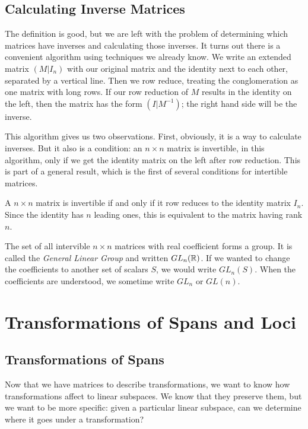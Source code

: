 \documentclass[fleqn]{report}
\begin{document}
\section{Calculating Inverse Matrices}

The definition is good, but we are left with the problem of
determining which matrices have inverses and calculating those
inverses. It turns out there is a convenient algorithm using
techniques we already know. We write an extended matrix
$(M|I_n)$ with our original matrix and the identity next to
each other, separated by a vertical line. Then we row reduce,
treating the conglomeration as one matrix with long rows.
If our row reduction of $M$ results in the identity on the
left, then the matrix has the form $(I|M^{-1})$; the right
hand side will be the inverse.

This algorithm gives us two observations. First, obviously,
it is a way to calculate inverses. But it also is a
condition: an $n \times n$ matrix is invertible, in this
algorithm, only if we get the identity matrix on the left after
row reduction. This is part of a general result, which is the
first of several conditions for intertible matrices.

\begin{prop}
A $n \times n$ matrix is invertible if and only if it row
reduces to the identity matrix $I_n$. Since the identity has
$n$ leading ones, this is equivalent to the matrix having rank
$n$.
\end{prop}

\begin{defn}
The set of all intervible $n \times n$ matrices with real
coefficient forms a group. It is called the \emph{General
Linear Group} and written $GL_n(\mathbb{R})$. If we wanted to change
the coefficients to another set of scalars $S$, we would write
$GL_n(S)$. When the coefficients are understood, we sometime
write $GL_n$ or $GL(n)$.
\end{defn}

\chapter{Transformations of Spans and Loci}

\section{Transformations of Spans}

Now that we have matrices to describe transformations, we want
to know how transformations affect to linear subspaces. We know
that they preserve them, but we want to be more specific:
given a particular linear subspace, can we determine where it
goes under a transformation?
\end{document}
